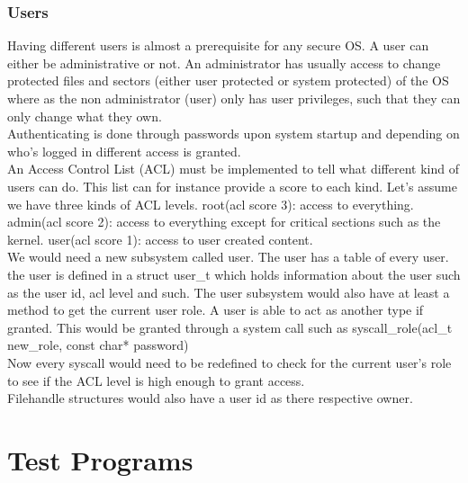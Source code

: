 \documentclass[12pt]{article}
\begin{document}
\subsubsection{Users}

Having different users is almost a prerequisite for any secure OS. A user can either be administrative or not. An administrator has usually access to change protected files and sectors (either user protected or system protected) of the OS where as the non administrator (user) only has user privileges, such that they can only change what they own. \\

Authenticating is done through passwords upon system startup and depending on who's logged in different access is granted. \\

An Access Control List (ACL) must be implemented to tell what different kind of users can do. This list can for instance provide a score to each kind.  Let's assume we have three kinds of ACL levels. root(acl score 3): access to everything. admin(acl score 2): access to everything except for critical sections such as the kernel. user(acl score 1): access to user created content. \\

We would need a new subsystem called user. The user has a table of every user. the user is defined in a struct user\_t which holds information about the user such as the user id, acl level and such. The user subsystem would also have at least a method to get the current user role. A user is able to act as another type if granted. This would be granted through a system call such as syscall\_role(acl\_t new\_role, const char* password)\\

Now every syscall would need to be redefined to check for the current user's role to see if the ACL level is high enough to grant access. \\

Filehandle structures would also have a user id as there respective owner.

\newpage

\appendix
\section{Test Programs}
\end{document}
